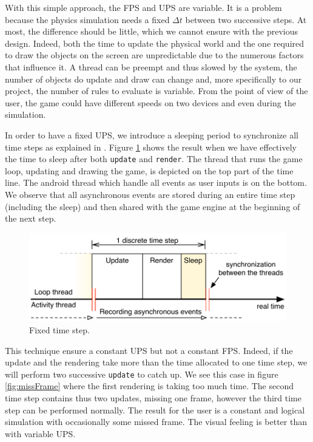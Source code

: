 \documentclass[11pt,a4paper]{article}
\begin{document}
With this simple approach, the FPS and UPS are variable. It is a problem because the physics simulation needs a fixed $\Delta t$ between two successive steps. At most, the difference should be little, which we cannot ensure with the previous design. Indeed, both the time to update the physical world and the one required to draw the objects on the screen are unpredictable due to the numerous factors that influence it. A thread can be preempt and thus slowed by the system, the number of objects do update and draw can change and, more specifically to our project, the number of rules to evaluate is variable. From the point of view of the user, the game could have different speeds on two devices and even during the simulation.

In order to have a fixed UPS, we introduce a sleeping period to synchronize all time steps as explained in \cite{FixYourTimestep, AndroidGameLoop}. Figure \ref{fig:fixedTimeStep} shows the result when we have effectively the time to sleep after both \texttt{update} and \texttt{render}. The thread that runs the game loop, updating and drawing the game, is depicted on the top part of the time line. The android thread which handle all events as user inputs is on the bottom. We observe that all asynchronous events are stored during an entire time step (including the sleep) and then shared with the game engine at the beginning of the next step.

\begin{figure}[h]
\centering
\includegraphics[scale = 0.8]{images/fixedTimeStep} 
\caption{Fixed time step.}
\label{fig:fixedTimeStep}
\end{figure}

This technique ensure a constant UPS but not a constant FPS. Indeed, if the update and the rendering take more than the time allocated to one time step, we will perform two successive \texttt{update} to catch up. We see this case in figure \ref{fig:missFrame} where the first rendering is taking too much time. The second time step contains thus two updates, missing one frame, however the third time step can be performed normally. The result for the user is a constant and logical simulation with occasionally some missed frame. The visual feeling is better than with variable UPS.
\end{document}
